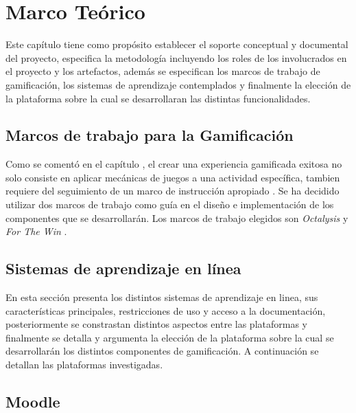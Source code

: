 \chapter{Marco Teórico}
\label{ch:marcoTeorico}

 Este capítulo tiene como propósito establecer el soporte conceptual y documental del proyecto,
 especifica la metodología incluyendo los roles de los involucrados en el proyecto y los artefactos,
 además se especifican los marcos de trabajo de gamificación, los sistemas de aprendizaje contemplados
 y finalmente la elección de la plataforma sobre la cual se desarrollaran las distintas funcionalidades.

    

\section{Marcos de trabajo para la Gamificación}

 Como se comentó en el capítulo , el crear una experiencia
 gamificada exitosa no solo consiste en aplicar mecánicas de juegos a una actividad
 específica, tambien requiere del seguimiento de un marco de instrucción apropiado \cite[p. 1110]{GamInE-Learning}.
 Se ha decidido utilizar dos marcos de trabajo como guía en el diseño e implementación
 de los componentes que se desarrollarán. Los marcos de trabajo elegidos son {\it Octalysis}
 \cite{Octalysis} y {\it For The Win} \cite{ForTheWin}.

    
    

\clearpage
\section{Sistemas de aprendizaje en línea}

 En esta sección presenta los distintos sistemas de aprendizaje en linea, sus características
 principales, restricciones de uso y acceso a la documentación, posteriormente se constrastan
 distintos aspectos entre las plataformas y finalmente se detalla y argumenta la elección de 
 la plataforma sobre la cual se desarrollarán los distintos componentes de gamificación.
 A continuación se detallan las plataformas investigadas.

    

\section{Moodle}

